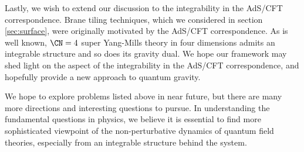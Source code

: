 Lastly, we wish to extend our discussion to the integrability in
the AdS/CFT correspondence.
Brane tiling techniques, which we considered in section \ref{sec:surface},
were originally motivated by the AdS/CFT correspondence.
As is well known, $\CN=4$ super Yang-Mills theory in four dimensions admits
an integrable structure and so does its gravity dual.
We hope our framework may shed light on the aspect of the integrability
in the AdS/CFT correspondence, and hopefully provide a new approach to quantum
gravity.



We hope to explore problems listed above in near future,
but there are many more directions and interesting questions to pursue.
In understanding the fundamental questions in physics, we believe
it is essential to find more sophisticated viewpoint of the non-perturbative dynamics
of quantum field theories, especially from an integrable structure behind the system.









